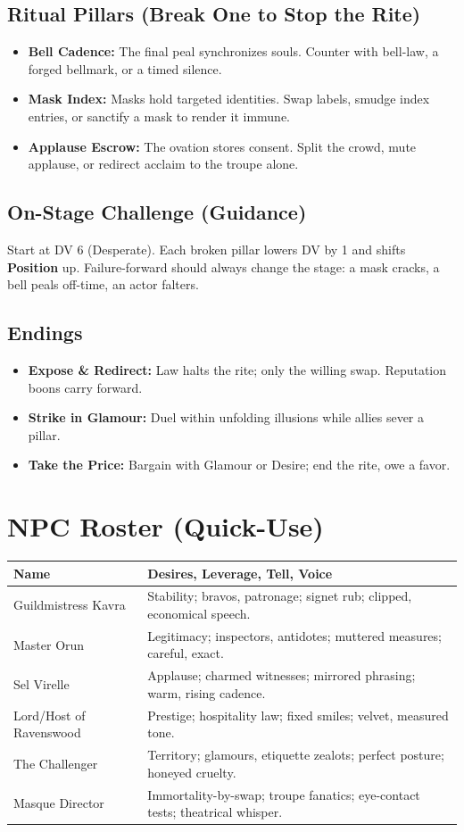 \documentclass[11pt]{article}
\newcommand{\Term}[1]{\textbf{#1}}
\newcommand{\Position}{\Term{Position}}
\begin{document}
\subsection*{Ritual Pillars (Break One to Stop the Rite)}
\begin{itemize}
\item \textbf{Bell Cadence:} The final peal synchronizes souls. Counter with bell-law, a forged bellmark, or a timed silence.
\item \textbf{Mask Index:} Masks hold targeted identities. Swap labels, smudge index entries, or sanctify a mask to render it immune.
\item \textbf{Applause Escrow:} The ovation stores consent. Split the crowd, mute applause, or redirect acclaim to the troupe alone.
\end{itemize}

\subsection*{On-Stage Challenge (Guidance)}
Start at DV 6 (Desperate). Each broken pillar lowers DV by 1 and shifts \Position{} up. Failure-forward should always change the stage: a mask cracks, a bell peals off-time, an actor falters.

\subsection*{Endings}
\begin{itemize}
\item \textbf{Expose \& Redirect:} Law halts the rite; only the willing swap. Reputation boons carry forward.
\item \textbf{Strike in Glamour:} Duel within unfolding illusions while allies sever a pillar.
\item \textbf{Take the Price:} Bargain with Glamour or Desire; end the rite, owe a favor.
\end{itemize}

\section*{NPC Roster (Quick-Use)}

\begin{tabularx}{\linewidth}{@{}l X@{}}
\toprule
\textbf{Name} & \textbf{Desires, Leverage, Tell, Voice}\\
\midrule
Guildmistress Kavra & Stability; bravos, patronage; signet rub; clipped, economical speech.\\
Master Orun & Legitimacy; inspectors, antidotes; muttered measures; careful, exact.\\
Sel Virelle & Applause; charmed witnesses; mirrored phrasing; warm, rising cadence.\\
Lord/Host of Ravenswood & Prestige; hospitality law; fixed smiles; velvet, measured tone.\\
The Challenger & Territory; glamours, etiquette zealots; perfect posture; honeyed cruelty.\\
Masque Director & Immortality-by-swap; troupe fanatics; eye-contact tests; theatrical whisper.\\
\bottomrule
\end{tabularx}
\end{document}
